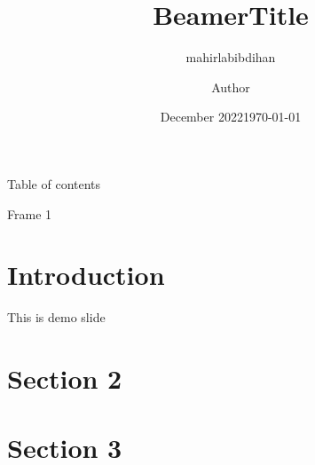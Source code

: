 \documentclass{beamer}
\title{Beamer}
\author{mahirlabibdihan }
\date{December 2022}
\title{Title}
\author{Author}
\institute{Institute}
\date{\today}
\begin{document}
\frame{\titlepage}
\begin{frame}{Table of contents}
    \tableofcontents
\end{frame}
\begin{frame}{Frame 1}
\section{Introduction}
This is demo slide
\section{Section 2}
\section{Section 3}
\end{frame}
\end{document}
